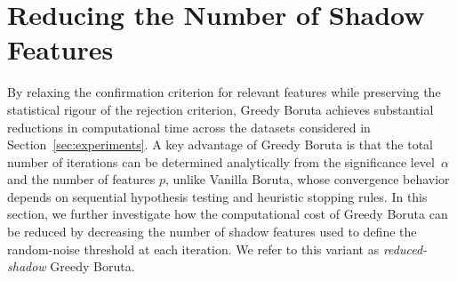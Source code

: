 \documentclass[runningheads]{llncs}
\begin{document}


\section{Reducing the Number of Shadow Features}
\label{app:add_results_reducing_shadows}

By relaxing the confirmation criterion for relevant features while preserving the statistical rigour of the rejection criterion, Greedy Boruta achieves substantial reductions in computational time across the datasets considered in Section~\ref{sec:experiments}. A key advantage of Greedy Boruta is that the total number of iterations can be determined analytically from the significance level~\(\alpha\) and the number of features $p$, unlike Vanilla Boruta, whose convergence behavior depends on sequential hypothesis testing and heuristic stopping rules. In this section, we further investigate how the computational cost of Greedy Boruta can be reduced by decreasing the number of shadow features used to define the random-noise threshold at each iteration. We refer to this variant as \textit{reduced-shadow} Greedy Boruta.
\end{document}

